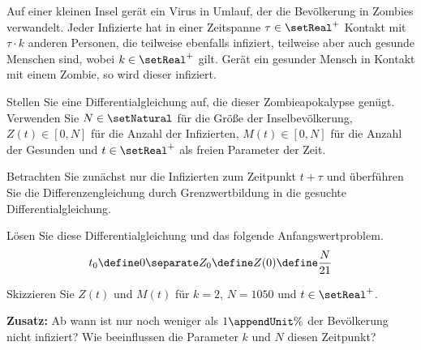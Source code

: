 \begin{atiTask}[
	title = Eine Zombieapokalypse
]
	Auf einer kleinen Insel gerät ein Virus in Umlauf, der die Bevölkerung in Zombies verwandelt.
	Jeder Infizierte hat in einer Zeitspanne $\tau\in\setReal^+$ Kontakt mit $\tau\cdot k$ anderen Personen, die teilweise ebenfalls infiziert, teilweise aber auch gesunde Menschen sind, wobei $k\in\setReal^+$ gilt.
	Gerät ein gesunder Mensch in Kontakt mit einem Zombie, so wird dieser infiziert.
	\medskip
	\begin{atiSubtasks}
		\item{
			Stellen Sie eine Differentialgleichung auf, die dieser Zombieapokalypse genügt.
			Verwenden Sie $N\in\setNatural$ für die Größe der Inselbevölkerung, $Z(t)\in[0,N]$ für die Anzahl der Infizierten, $M(t)\in[0,N]$ für die Anzahl der Gesunden und $t\in\setReal^+$ als freien Parameter der Zeit.

			\begin{atiNote}
				Betrachten Sie zunächst nur die Infizierten zum Zeitpunkt $t+\tau$ und überführen Sie die Differenzengleichung durch Grenzwertbildung in die gesuchte Differentialgleichung.
			\end{atiNote}
		}
		\item{
			Lösen Sie diese Differentialgleichung und das folgende Anfangswertproblem.
			\[
				t_0\define 0\separate Z_0\define Z(0) \define \frac{N}{21}
			\]
		}
		\item{
			Skizzieren Sie $Z(t)$ und $M(t)$ für $k=2$, $N=1050$ und $t\in\setReal^+$.
		}
		\item{
			\textbf{Zusatz:} Ab wann ist nur noch weniger als $1\appendUnit{\%}$ der Bevölkerung nicht infiziert?
			Wie beeinflussen die Parameter $k$ und $N$ diesen Zeitpunkt?
		}
	\end{atiSubtasks}
\end{atiTask}
